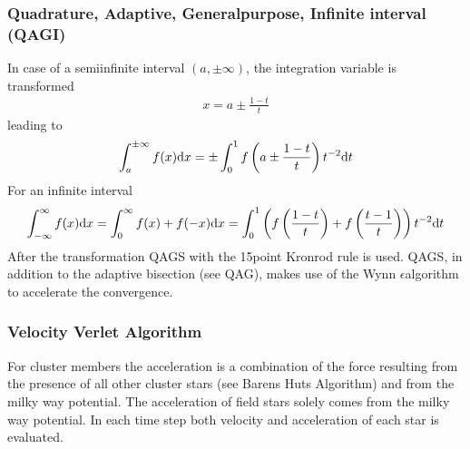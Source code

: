 \documentclass[letterpaper,10pt,english]{sphinxmanual}
\begin{document}
			\subsubsection{Quadrature, Adaptive, General\sphinxhyphen{}purpose, Infinite interval (QAGI)}
				\label{\detokenize{NBodySimulation/Integration:quadrature-adaptive-general-purpose-infinite-interval-qagi}}
				\sphinxAtStartPar
				In case of a semi\sphinxhyphen{}infinite interval \((a,\pm \infty)\), the integration variable is transformed
				\begin{equation*}
				\begin{split}x = a\pm\frac{1-t}{t}\end{split}
				\end{equation*}
				\sphinxAtStartPar
				leading to
				\begin{equation*}
				\begin{split}\int_a^{\pm \infty}f(x)\textup{d}x = \pm \int_0^1 f \left(a\pm\frac{1-t}{t}\right)t^{-2}\textup{d}t\end{split}
				\end{equation*}
				\sphinxAtStartPar
				For an infinite interval
				\begin{equation*}
				\begin{split}\int_{-\infty}^{\infty}f(x)\textup{d}x =
				\int_0^\infty f(x)+f(-x)\textup{d}x =
				\int_0^1  \left ( f \left(\frac{1-t}{t}\right) + f \left(\frac{t-1}{t}\right) \right )  t^{-2}\textup{d}t\end{split}
				\end{equation*}
				\sphinxAtStartPar
				After the transformation QAGS with the 15\sphinxhyphen{}point Kronrod rule is used.
				QAGS, in addition to the adaptive bisection (see QAG), makes use of the Wynn \(\epsilon\)\sphinxhyphen{}algorithm to accelerate the convergence.
			
			
			\subsubsection{Velocity Verlet Algorithm}
				\label{\detokenize{NBodySimulation/Integration:velocity-verlet-algorithm}}
				\sphinxAtStartPar
				For cluster members the acceleration is a combination of the force resulting from the presence of all other cluster stars (see Barens Huts Algorithm)
				and from the milky way potential. The acceleration of field stars solely comes from the milky way potential.
				In each time step both velocity and acceleration of each star is evaluated.
				
\end{document}
